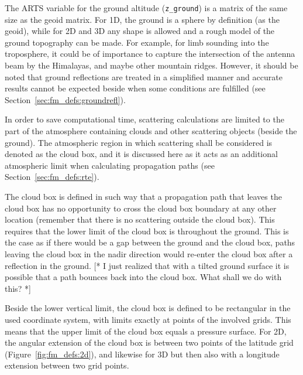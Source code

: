 The ARTS variable for the ground altitude (\verb|z_ground|) is a
matrix of the same size as the geoid matrix.  For 1D, the ground is a
sphere by definition (as the geoid), while for 2D and 3D any shape is
allowed and a rough model of the ground topography can be made. For
example, for limb sounding into the troposphere, it could be of
importance to capture the intersection of the antenna beam by the
Himalayas, and maybe other mountain ridges.  However, it should be
noted that ground reflections are treated in a simplified manner and
accurate results cannot be expected beside when some conditions are
fulfilled (see Section~\ref{sec:fm_defs:groundrefl}).


\label{sec:fm_defs:cloudbox}

In order to save computational time, scattering calculations are
limited to the part of the atmosphere containing clouds and other
scattering objects (beside the ground). The atmospheric region in
which scattering shall be considered is denoted as the cloud box, and
it is discussed here as it acts as an additional atmospheric limit
when calculating propagation paths (see Section~\ref{sec:fm_defs:rte}). 

The cloud box is defined in such way that a propagation path that
leaves the cloud box has no opportunity to cross the cloud box
boundary at any other location (remember that there is no scattering
outside the cloud box). This requires that the lower limit of the
cloud box is throughout the ground. This is the case as if there would
be a gap between the ground and the cloud box, paths leaving the cloud
box in the nadir direction would re-enter the cloud box after a
reflection in the ground. [* I just realized that with a tilted ground
surface it is possible that a path bounces back into the cloud box.
What shall we do with this? *]

Beside the lower vertical limit, the cloud box is defined to be
rectangular in the used coordinate system, with limits exactly at
points of the involved grids. This means that the upper limit of the
cloud box equals a pressure surface. For 2D, the angular extension of
the cloud box is between two points of the latitude grid
(Figure~\ref{fig:fm_defs:2d}), and likewise for 3D but then also with
a longitude extension between two grid points.



\label{sec:fm_defs:sensor}

